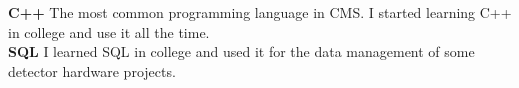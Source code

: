 \documentclass[10pt]{article} %
\begin{document}
\textbf{C++}
\small{
The most common programming language in CMS. I started learning C++ in college and use it all the time.
}\\

\textbf{SQL}
\small{
I learned SQL in college and used it for the data management of some detector hardware projects. 
}



\end{document}
